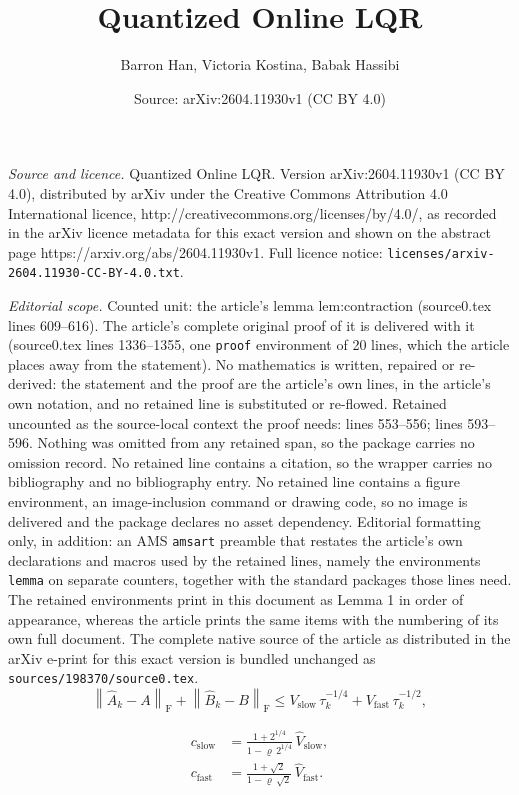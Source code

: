 \documentclass[10pt,a4paper]{amsart}
\title{Quantized Online LQR}
\author{Barron Han, Victoria Kostina, Babak Hassibi}
\date{Source: arXiv:2604.11930v1 (CC BY 4.0)}
\newcommand{\Ahat}{\widehat{A}}
\newcommand{\Astar}{A}
\newcommand{\Bhat}{\widehat{B}}
\newcommand{\Bstar}{B}
\newcommand{\Fnorm}[1]{\left\lVert #1 \right\rVert_{\mathrm{F}}}
\newcommand{\Vfast}{V_{\mathrm{fast}}}
\newcommand{\Vfasthat}{\widehat{V}_{\mathrm{fast}}}
\newcommand{\Vslow}{V_{\mathrm{slow}}}
\newcommand{\Vslowhat}{\widehat{V}_{\mathrm{slow}}}
\newcommand{\cfast}{c_{\mathrm{fast}}}
\newcommand{\cslow}{c_{\mathrm{slow}}}
\newcommand{\tauk}{\tau_k}
\begin{document}
\maketitle

\noindent\emph{Source and licence.} Quantized Online LQR. Version arXiv:2604.11930v1 (CC BY 4.0), distributed by arXiv under the Creative Commons Attribution 4.0 International licence, http://creativecommons.org/licenses/by/4.0/, as recorded in the arXiv licence metadata for this exact version and shown on the abstract page https://arxiv.org/abs/2604.11930v1. Full licence notice: \texttt{licenses/arxiv-2604.11930-CC-BY-4.0.txt}.\par\smallskip

\noindent\textit{Editorial scope.} Counted unit: the article's lemma lem:contraction (source0.tex lines 609--616). The article's complete original proof of it is delivered with it (source0.tex lines 1336--1355, one \texttt{proof} environment of 20 lines, which the article places away from the statement). No mathematics is written, repaired or re-derived: the statement and the proof are the article's own lines, in the article's own notation, and no retained line is substituted or re-flowed.  Retained uncounted as the source-local context the proof needs: lines 553--556; lines 593--596.  Nothing was omitted from any retained span, so the package carries no omission record.  No retained line contains a citation, so the wrapper carries no bibliography and no bibliography entry.  No retained line contains a figure environment, an image-inclusion command or drawing code, so no image is delivered and the package declares no asset dependency.  Editorial formatting only, in addition: an AMS \texttt{amsart} preamble that restates the article's own declarations and macros used by the retained lines, namely the environments \texttt{lemma} on separate counters, together with the standard packages those lines need.  The retained environments print in this document as Lemma 1 in order of appearance, whereas the article prints the same items with the numbering of its own full document.  The complete native source of the article as distributed in the arXiv e-print for this exact version is bundled unchanged as \texttt{sources/198370/source0.tex}.
    \begin{equation}
        \label{eq:ols-two-rate}
        \Fnorm{\Ahat_k - \Astar} + \Fnorm{\Bhat_k - \Bstar} \le \Vslow\,\tauk^{-1/4} + \Vfast\,\tauk^{-1/2},
    \end{equation}

\begin{align}
    \cslow &= \frac{1 + 2^{1/4}}{1 - \varrho\,2^{1/4}}\,\Vslowhat, \label{eq:cslow-impl} \\
    \cfast &= \frac{1+\sqrt{2}}{1 - \varrho\,\sqrt{2}}\,\Vfasthat. \label{eq:cfast-impl}
\end{align}
\end{document}
